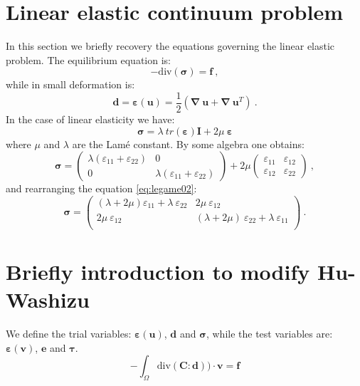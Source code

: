 \documentclass[preprint,12pt,authoryear]{elsarticle}
\begin{document}
\section{Linear elastic continuum problem}\label{sec:two}
In this section we briefly recovery the equations governing the linear elastic problem. 
The equilibrium equation is:
\begin{equation} \label{eq:equilibrio01}
- \mbox{div}(\bm{\sigma}) = \bm{f}\:,
\end{equation}
while in small deformation is:
\begin{equation}\label{eq:congruenza01}
\bm{d} = \bm{\varepsilon}(\bm{u}) = 
\frac{1}{2}(\bm{\nabla} \: \bm{u} + \bm{\nabla} \: \bm{u}^{T}) \:.
\end{equation}
In the case of linear elasticity we have:
\begin{equation} \label{eq:legame01}
\bm{\sigma} = \lambda \: tr(\bm{\varepsilon}) \bm{I} 
+ 2\mu \: \bm{\varepsilon}
\end{equation}
where $\mu$ and $\lambda$ are the Lamé constant.
By some algebra one obtains:
\begin{equation} \label{eq:legame02}
\bm{\sigma} =
\left(
\begin{array}{cc}
\lambda (\varepsilon_{11} + \varepsilon_{22}) & 0 \\
0 & \lambda (\varepsilon_{11} + \varepsilon_{22}) 
\end{array}
\right) +2\mu
\left(
\begin{array}{cc}
\varepsilon_{11} & \varepsilon_{12} \\
\varepsilon_{12} & \varepsilon_{22}
\end{array}
\right)\:,
\end{equation}
and rearranging the equation \eqref{eq:legame02}:
\begin{equation} \label{eq:legame03}
\bm{\sigma} =
\left(
\begin{array}{ll}
(\lambda+2\mu) \varepsilon_{11} + \lambda \: \varepsilon_{22} & 2\mu \: \varepsilon_{12} \\
2\mu \: \varepsilon_{12} & (\lambda+2\mu) \: \varepsilon_{22} + \lambda \: \varepsilon_{11}  \\
\end{array}
\right)\:.
\end{equation}

\section{Briefly introduction to modify Hu-Washizu}\label{sec:three}
We define the trial variables: $\bm{\varepsilon}(\bm{u})$, $\bm{d}$ and 
$\bm{\sigma}$, while the test variables are: $\bm{\varepsilon}(\bm{v})$, 
$\bm{e}$ and $\bm{\tau}$. 
\begin{equation}
-\int_{\Omega} \mbox{div} ( \bm{C} : \bm{d}) )\cdot \bm{v} = \bm{f}
\end{equation}
\end{document}
